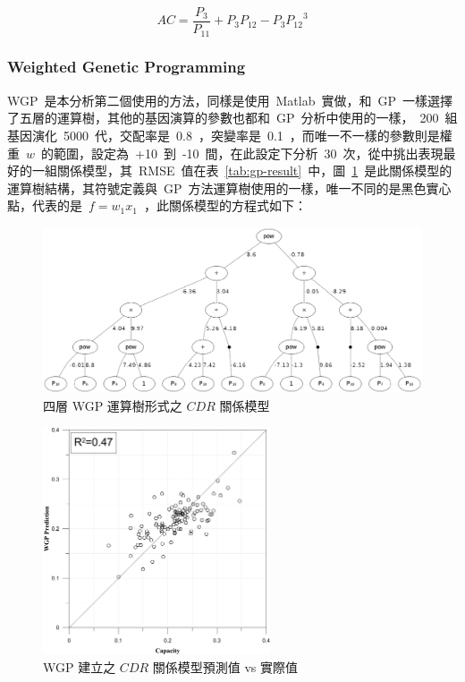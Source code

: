 \begin{equation} AC = \dfrac{P_3}{P_{11}} + P_3 P_{12} - P_3 {P_{12}}^3  \label{eq:GP_AC}\end{equation}

\subsubsection{Weighted Genetic Programming}

WGP~是本分析第二個使用的方法，同樣是使用~Matlab~實做，和~GP~一樣選擇了五層的運算樹，其他的基因演算的參數也都和~GP~分析中使用的一樣，~200~組基因演化~5000~代，交配率是~0.8~，突變率是~0.1~，而唯一不一樣的參數則是權重~$w$~的範圍，設定為~+10~到~-10~間，在此設定下分析~30~次，從中挑出表現最好的一組關係模型，其~RMSE~值在表~\ref{tab:gp-result}~中，圖~\ref{fig:4LWGP}~是此關係模型的運算樹結構，其符號定義與~GP~方法運算樹使用的一樣，唯一不同的是黑色實心點，代表的是~$f = w_1x_1$~，此關係模型的方程式如下：

\begin{figure}[!hbtp]
  \begin{center}
    \includegraphics[width=1.0\textwidth]{figures/4-layer-wgp.png}
    \caption{四層 WGP 運算樹形式之 $CDR$ 關係模型} 
    \label{fig:4LWGP}
  \end{center}
\end{figure}

\begin{figure}[hbtp]
  \begin{center}
    \includegraphics[width=0.6\textwidth]{figures/wgp.pdf}
    \caption{WGP 建立之 $CDR$ 關係模型預測值 vs 實際值} 
    \label{fig:WGP}
  \end{center}
\end{figure}



